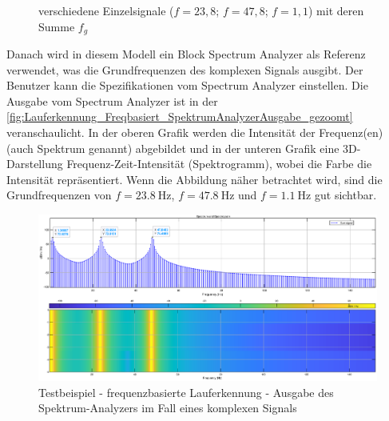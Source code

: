 \begin{figure}[htpb]
	\centering
	\caption{verschiedene Einzelsignale ($f=23,8$; $f=47,8$; $f=1,1$) mit deren Summe $f_g$}
	\label{fig:Testsignal_AllViews}
\end{figure}
Danach wird in diesem Modell ein Block \glqq Spectrum Analyzer\grqq{} als Referenz verwendet, was die Grundfrequenzen des komplexen Signals ausgibt. Der Benutzer kann die Spezifikationen vom \glqq Spectrum Analyzer\grqq{} einstellen. Die Ausgabe vom \glqq Spectrum Analyzer\grqq{} ist in der \autoref{fig:Lauferkennung_Freqbasiert_SpektrumAnalyzerAusgabe_gezoomt} veranschaulicht. In der oberen Grafik werden die Intensität der Frequenz(en) (auch Spektrum genannt) abgebildet und in der unteren Grafik eine 3D-Darstellung \glqq Frequenz-Zeit-Intensität\grqq{} (Spektrogramm), wobei die Farbe die Intensität repräsentiert. Wenn die Abbildung näher betrachtet wird, sind die Grundfrequenzen von $f=\SI{23,8}{\hertz}$, $f=\SI{47,8}{\hertz}$ und $f=\SI{1,1}{\hertz}$ gut sichtbar.




\begin{figure}[htpb]
	\centering
	\includegraphics[width=\textwidth]{Bilder/frequenzbasierte_Lauferkennung_SpectrumAnalyzer_Ausgabe2_eps.eps}
	\caption{Testbeispiel - frequenzbasierte Lauferkennung - Ausgabe des Spektrum-Analyzers im Fall eines komplexen Signals}
	\label{fig:Lauferkennung_Freqbasiert_SpektrumAnalyzerAusgabe_gezoomt}
\end{figure}

